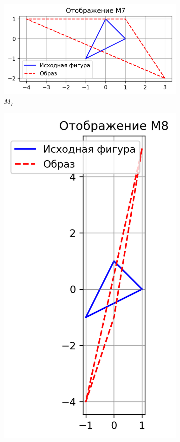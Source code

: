 \clearpage

\begin{figure}[H]
  \centering
  \begin{subfigure}[b]{0.3\textwidth}
    \includegraphics[width=\linewidth]{plots/M7.png}
    \caption{$M_7$}
  \end{subfigure}\hfill
  \begin{subfigure}[b]{0.3\textwidth}
    \includegraphics[width=\linewidth]{plots/M8.png}

\end{subfigure}
\end{figure}

